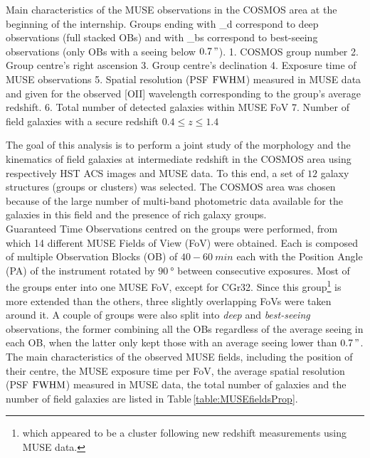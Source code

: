 \begin{table}[htbp]
	\caption[Main characteristics of the MUSE observations in the COSMOS area.]{Main characteristics of the MUSE observations in the COSMOS area at the beginning of the internship. Groups ending with \_d correspond to deep observations (full stacked OBs) and with \_bs correspond to best-seeing observations (only OBs with a seeing below $\SI{0.7}{"}$). 1. COSMOS group number 2. Group centre's right ascension 3. Group centre's declination 4. Exposure time of MUSE observations 5. Spatial resolution (PSF $\rm{FWHM}$) measured in MUSE data and given for the observed [OII] wavelength corresponding to the group's average redshift. 6. Total number of detected galaxies within MUSE FoV 7. Number of field galaxies with a secure redshift $0.4 \leq z \leq 1.4$}
	\label{table:MUSEfieldsProp}
\end{table}

The goal of this analysis is to perform a joint study of the morphology and the kinematics of field galaxies at intermediate redshift in the COSMOS area  using respectively HST ACS images and MUSE data. To this end, a set of $12$ galaxy structures (groups or clusters) was selected. The COSMOS area was chosen because of the large number of multi-band photometric data available for the galaxies in this field and the presence of rich galaxy groups.\\

Guaranteed Time Observations centred on the groups were performed, from which 14 different MUSE Fields of View (FoV) were obtained. Each is composed of multiple Observation Blocks (OB) of $40-\SI{60}{min}$ each with the Position Angle (PA) of the instrument rotated by $\SI{90}{\degree}$ between consecutive exposures. Most of the groups enter into one MUSE FoV, except for CGr32. Since this group\footnote{which appeared to be a cluster following new redshift measurements using MUSE data.} is more extended than the others, three slightly overlapping FoVs were taken around it. A couple of groups were also split into \textit{deep} and \textit{best-seeing} observations, the former combining all the OBs regardless of the average seeing in each OB, when the latter only kept those with an average seeing lower than $\SI{0.7}{"}$. The main characteristics of the observed MUSE fields, including the position of their centre, the MUSE exposure time per FoV, the average spatial resolution (PSF $\rm{FWHM}$) measured in MUSE data, the total number of galaxies and the number of field galaxies are listed in Table\,\ref{table:MUSEfieldsProp}. \\


